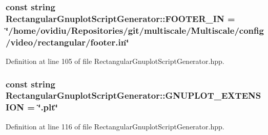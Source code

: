 \hypertarget{classmultiscale_1_1video_1_1RectangularGnuplotScriptGenerator_a5bff725c865bc3a426351644cee34229}{
\subsubsection[{\-F\-O\-O\-T\-E\-R\-\_\-\-I\-N}]{\setlength{\rightskip}{0pt plus 5cm}const string {\bf \-Rectangular\-Gnuplot\-Script\-Generator\-::\-F\-O\-O\-T\-E\-R\-\_\-\-I\-N} = \char`\"{}/home/ovidiu/\-Repositories/git/multiscale/\-Multiscale/config/video/rectangular/footer.\-in\char`\"{}}}\label{classmultiscale_1_1video_1_1RectangularGnuplotScriptGenerator_a5bff725c865bc3a426351644cee34229}


\-Definition at line 105 of file \-Rectangular\-Gnuplot\-Script\-Generator.\-hpp.

\hypertarget{classmultiscale_1_1video_1_1RectangularGnuplotScriptGenerator_afa1626f7904b3006ac768f770c799283}{
\subsubsection[{\-G\-N\-U\-P\-L\-O\-T\-\_\-\-E\-X\-T\-E\-N\-S\-I\-O\-N}]{\setlength{\rightskip}{0pt plus 5cm}const string {\bf \-Rectangular\-Gnuplot\-Script\-Generator\-::\-G\-N\-U\-P\-L\-O\-T\-\_\-\-E\-X\-T\-E\-N\-S\-I\-O\-N} = \char`\"{}.plt\char`\"{}}}\label{classmultiscale_1_1video_1_1RectangularGnuplotScriptGenerator_afa1626f7904b3006ac768f770c799283}


\-Definition at line 116 of file \-Rectangular\-Gnuplot\-Script\-Generator.\-hpp.

